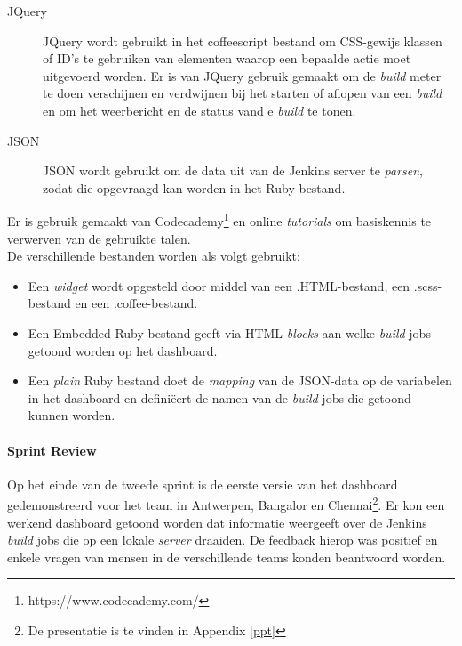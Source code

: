 \documentclass[10pt,a4paper]{article}
\begin{document}
\begin{description}
\item[JQuery] JQuery wordt gebruikt in het coffeescript bestand om CSS-gewijs klassen of ID's te gebruiken van elementen waarop een bepaalde actie moet uitgevoerd worden. Er is van JQuery gebruik gemaakt om de \textit{build} meter te doen verschijnen en verdwijnen bij het starten of aflopen van een \textit{build} en om het weerbericht en de status vand e \textit{build} te tonen.
\item[JSON] JSON wordt gebruikt om de data uit van de Jenkins server te \textit{parsen}, zodat die opgevraagd kan worden in het Ruby bestand.
\end{description}
Er is gebruik gemaakt van Codecademy\footnote{https://www.codecademy.com/} en online \textit{tutorials} om basiskennis te verwerven van de gebruikte talen.\\

De verschillende bestanden worden als volgt gebruikt:
\begin{itemize}
\item Een \textit{widget} wordt opgesteld door middel van een .HTML-bestand, een .scss-bestand en een .coffee-bestand.
\item Een Embedded Ruby bestand geeft via HTML-\textit{blocks} aan welke \textit{build} jobs getoond worden op het dashboard.
\item Een \textit{plain} Ruby bestand doet de \textit{mapping} van de JSON-data op de variabelen in het dashboard en defini\"eert de namen van de \textit{build} jobs die getoond kunnen worden.
\end{itemize}
\paragraph{Sprint Review} Op het einde van de tweede sprint is de eerste versie van het dashboard gedemonstreerd voor het team in Antwerpen, Bangalor en Chennai\footnote{De presentatie is te vinden in Appendix \ref{ppt}}. Er kon een werkend dashboard getoond worden dat informatie weergeeft over de Jenkins \textit{build} jobs die op een lokale \textit{server} draaiden. De feedback hierop was positief en enkele vragen van mensen in de verschillende teams konden beantwoord worden. 
\end{document}
